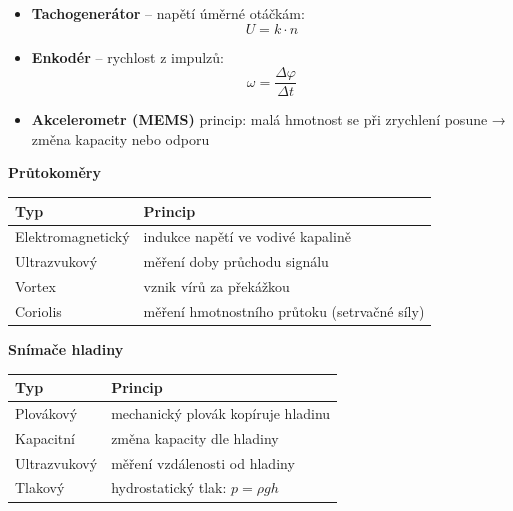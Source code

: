 \documentclass[a4paper,10pt]{article}
\begin{document}
\begin{vysvetlenibox}
\begin{itemize}
\item \textbf{Tachogenerátor} – napětí úměrné otáčkám:
\[
U = k \cdot n
\]

\item \textbf{Enkodér} – rychlost z impulzů:
\[
\omega = \frac{\Delta \varphi}{\Delta t}
\]

\item \textbf{Akcelerometr (MEMS)}
princip: malá hmotnost se při zrychlení posune → změna kapacity nebo odporu
\end{itemize}

\textbf{Průtokoměry}

\begin{tabularx}{\linewidth}{l X}
\toprule
Typ & Princip \\
\midrule
Elektromagnetický & indukce napětí ve vodivé kapalině \\
Ultrazvukový & měření doby průchodu signálu \\
Vortex & vznik vírů za překážkou \\
Coriolis & měření hmotnostního průtoku (setrvačné síly) \\
\bottomrule
\end{tabularx}

\textbf{Snímače hladiny}

\begin{tabularx}{\linewidth}{l X}
\toprule
Typ & Princip \\
\midrule
Plovákový & mechanický plovák kopíruje hladinu \\
Kapacitní & změna kapacity dle hladiny \\
Ultrazvukový & měření vzdálenosti od hladiny \\
Tlakový & hydrostatický tlak: $p = \rho g h$ \\
\bottomrule
\end{tabularx}

\end{vysvetlenibox}
\end{document}
